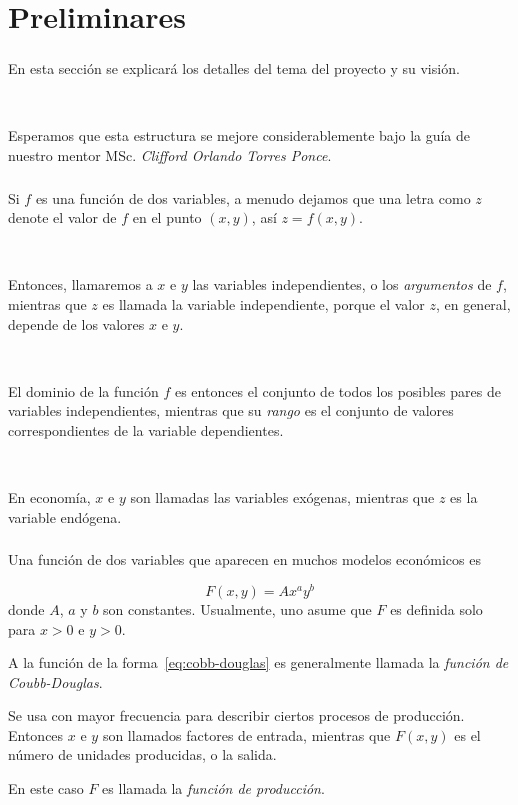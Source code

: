 \frame{\titlepage}

\section{Preliminares}

\begin{frame}
\frametitle{\secname}

En esta sección se explicará los detalles del tema del proyecto y su visión.

\

Esperamos que esta estructura se mejore considerablemente bajo la guía de nuestro mentor MSc. \emph{Clifford Orlando Torres Ponce}.
\end{frame}

\begin{frame}
\frametitle{\secname}

Si $f$ es una función de dos variables, a menudo dejamos que una letra como $z$ denote el valor de $f$ en el punto $\left(x,y\right)$, así $z=f\left(x,y\right)$.

\

Entonces, llamaremos a $x$ e $y$ las \alert{variables independientes}, o los \emph{argumentos} de $f$, mientras que $z$ es llamada la \alert{variable independiente}, porque el valor $z$, en general, depende de los valores $x$ e $y$.

\

El dominio de la función $f$ es entonces el conjunto de todos los posibles pares de variables independientes, mientras que su \emph{rango} es el conjunto de valores correspondientes de la variable dependientes.

\

En economía, $x$ e $y$ son llamadas las \alert{variables exógenas}, mientras que $z$ es la \alert{variable endógena}.
\end{frame}

\begin{frame}
\frametitle{\secname}

\begin{definition}
Una función de dos variables que aparecen en muchos modelos económicos es

\begin{equation}\label{eq:cobb-douglas}
F\left(x,y\right)=Ax^{a}y^{b}
\end{equation}
donde $A$, $a$ y $b$ son constantes. Usualmente, uno asume que $F$ es definida solo para $x>0$ e $y>0$.
\end{definition}

A la función de la forma~\eqref{eq:cobb-douglas} es generalmente llamada la \emph{función de Coubb-Douglas}.

Se usa con mayor frecuencia para describir ciertos procesos de producción. Entonces $x$ e $y$ son llamados \alert{factores de entrada}, mientras que $F\left(x,y\right)$ es el número de unidades producidas, o la \alert{salida}.

En este caso $F$ es llamada la \emph{función de producción}.
\end{frame}

